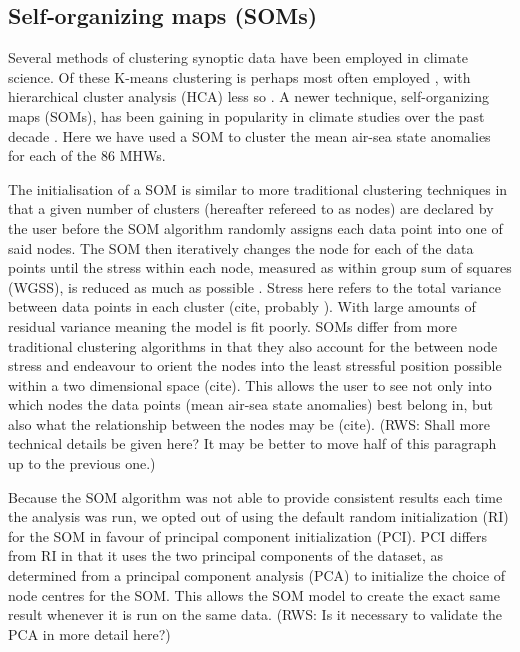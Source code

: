 \documentclass[a4paper,10pt,review]{elsarticle}
\begin{document}
\subsection{Self‐organizing maps (SOMs)}
Several methods of clustering synoptic data have been employed in climate science. Of these K-means clustering is perhaps most often employed \citep[e.g.][]{Corte-Real1998, Burrough2001, Kumar2011}, with hierarchical cluster analysis (HCA) less so \citep[e.g.][]{Unal2003}. A newer technique, self-organizing maps (SOMs), has been gaining in popularity in climate studies over the past decade \citep[e.g.][]{Cavazos2000, Hewitson2002, Morioka2010}. Here we have used a SOM to cluster the mean air-sea state anomalies for each of the 86 MHWs.

The initialisation of a SOM is similar to more traditional clustering techniques in that a given number of clusters (hereafter refereed to as nodes) are declared by the user before the SOM algorithm randomly assigns each data point into one of said nodes. The SOM then iteratively changes the node for each of the data points until the stress within each node, measured as within group sum of squares (WGSS), is reduced as much as possible \citep{Jain2010}. Stress here refers to the total variance between data points in each cluster (cite, probably \citep{Jain2010}). With large amounts of residual variance meaning the model is fit poorly. SOMs differ from more traditional clustering algorithms in that they also account for the between node stress and endeavour to orient the nodes into the least stressful position possible within a two dimensional space (cite). This allows the user to see not only into which nodes the data points (mean air-sea state anomalies) best belong in, but also what the relationship between the nodes may be (cite). (RWS: Shall more technical details be given here? It may be better to move half of this paragraph up to the previous one.)

Because the SOM algorithm was not able to provide consistent results each time the analysis was run, we opted out of using the default random initialization (RI) for the SOM in favour of principal component initialization (PCI). PCI differs from RI in that it uses the two principal components of the dataset, as determined from a principal component analysis (PCA) to initialize the choice of node centres for the SOM. This allows the SOM model to create the exact same result whenever it is run on the same data. (RWS: Is it necessary to validate the PCA in more detail here?)
\end{document}
